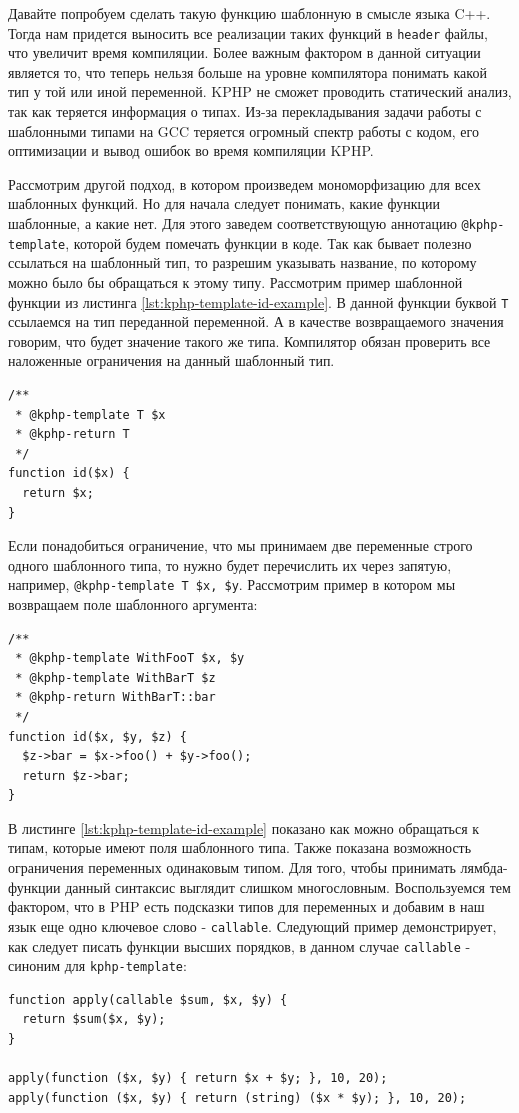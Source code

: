 Давайте попробуем сделать такую функцию шаблонную в смысле языка C++.
Тогда нам придется выносить все реализации таких функций в \verb|header| файлы, что увеличит время компиляции.
Более важным фактором в данной ситуации является то, что теперь нельзя больше на уровне компилятора понимать какой тип у той или иной переменной.
KPHP не сможет проводить статический анализ, так как теряется информация о типах.
Из-за перекладывания задачи работы с шаблонными типами на GCC \cite{gcc} теряется огромный спектр работы с кодом, его оптимизации и вывод ошибок во время компиляции KPHP.

Рассмотрим другой подход, в котором произведем мономорфизацию для всех шаблонных функций.
Но для начала следует понимать, какие функции шаблонные, а какие нет.
Для этого заведем соответствующую аннотацию \verb|@kphp-template|, которой будем помечать функции в коде.
Так как бывает полезно ссылаться на шаблонный тип, то разрешим указывать название, по которому можно было бы обращаться к этому типу.
Рассмотрим пример шаблонной функции из листинга \ref{lst:kphp-template-id-example}.
В данной функции буквой \verb|T| ссылаемся на тип переданной переменной.
А в качестве возвращаемого значения говорим, что будет значение такого же типа.
Компилятор обязан проверить все наложенные ограничения на данный шаблонный тип.
\begin{lstlisting}[caption={Пример функции id, с применением шаблонов},label={lst:kphp-template-id-example}]
/**
 * @kphp-template T $x
 * @kphp-return T
 */
function id($x) {
  return $x;
}
\end{lstlisting}

Если понадобиться ограничение, что мы принимаем две переменные строго одного шаблонного типа, то нужно будет перечислить их через запятую, например, \verb|@kphp-template T $x, $y|.
Рассмотрим пример в котором мы возвращаем поле шаблонного аргумента:
\begin{lstlisting}[caption={Пример функции id, с применением шаблонов},label={lst:kphp-template-id-example}]
/**
 * @kphp-template WithFooT $x, $y
 * @kphp-template WithBarT $z
 * @kphp-return WithBarT::bar
 */
function id($x, $y, $z) {
  $z->bar = $x->foo() + $y->foo();
  return $z->bar;
}
\end{lstlisting}

В листинге \ref{lst:kphp-template-id-example} показано как можно обращаться к типам, которые имеют поля шаблонного типа.
Также показана возможность ограничения переменных одинаковым типом.
Для того, чтобы принимать лямбда-функции данный синтаксис выглядит слишком многословным.
Воспользуемся тем фактором, что в PHP есть подсказки типов для переменных и добавим в наш язык еще одно ключевое слово - \verb|callable|.
Следующий пример демонстрирует, как следует писать функции высших порядков, в данном случае \verb|callable| - синоним для \verb|kphp-template|:
\begin{lstlisting}[caption={Пример использования ключевого слова callable},label={lst:callable_support}]
function apply(callable $sum, $x, $y) {
  return $sum($x, $y);
}

apply(function ($x, $y) { return $x + $y; }, 10, 20);
apply(function ($x, $y) { return (string) ($x * $y); }, 10, 20);
\end{lstlisting}

